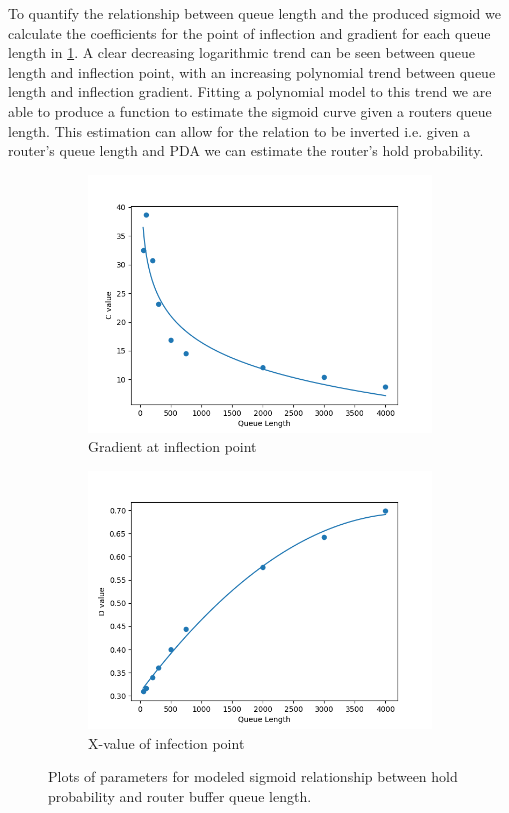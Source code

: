 To quantify the relationship between queue length and the produced sigmoid we calculate the coefficients for the point of inflection and gradient for each queue length in \cref{fig:Rsigmoidcoefs}. A clear decreasing logarithmic trend can be seen between queue length and inflection point, with an increasing polynomial trend between queue length and inflection gradient. Fitting a polynomial model to this trend we are able to produce a function to estimate the sigmoid curve given a routers queue length. This estimation can allow for the relation to be inverted i.e. given a router's queue length and PDA we can estimate the router's hold probability.
\begin{figure}[H]
    \centering
    \begin{subfigure}{0.475\textwidth}
        \includegraphics[width=\textwidth]{figs/results/qlen_param_c.png}
        \caption{Gradient at inflection point}
    \end{subfigure}
    \begin{subfigure}{0.475\textwidth}
        \includegraphics[width=\textwidth]{figs/results/qlen_param_d.png}
        \caption{X-value of infection point}
    \end{subfigure}
    \caption{Plots of parameters for modeled sigmoid relationship between hold probability and router buffer queue length.}
    \label{fig:Rsigmoidcoefs}
\end{figure}

